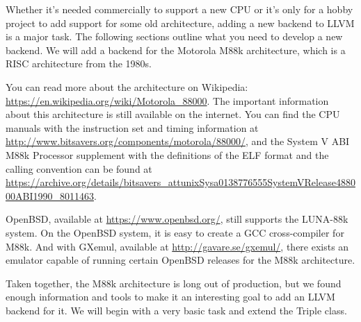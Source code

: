 Whether it's needed commercially to support a new CPU or it's only for a hobby project to add support for some old architecture, adding a new backend to LLVM is a major task. The following sections outline what you need to develop a new backend. We will add a backend for the Motorola M88k architecture, which is a RISC architecture from the 1980s.\par

\begin{tcolorbox}[colback=blue!5!white,colframe=blue!75!black, title=References]
\hspace*{0.7cm}You can read more about the architecture on Wikipedia: \url{https://en.wikipedia.org/wiki/Motorola_88000}. The important information about this architecture is still available on the internet. You can find the CPU manuals with the instruction set and timing information at \url{http://www.bitsavers.org/components/motorola/88000/}, and the System V ABI M88k Processor supplement with the definitions of the ELF format and the calling convention can be found at \url{https://archive.org/details/bitsavers_attunixSysa0138776555SystemVRelease488000ABI1990_8011463}.\par

\hspace*{0.7cm}OpenBSD, available at \url{https://www.openbsd.org/}, still supports the LUNA-88k system. On the OpenBSD system, it is easy to create a GCC cross-compiler for M88k. And with GXemul, available at \url{http://gavare.se/gxemul/}, there exists an emulator capable of running certain OpenBSD releases for the M88k architecture.
\end{tcolorbox}

Taken together, the M88k architecture is long out of production, but we found enough information and tools to make it an interesting goal to add an LLVM backend for it. We will begin with a very basic task and extend the Triple class.\par




















































